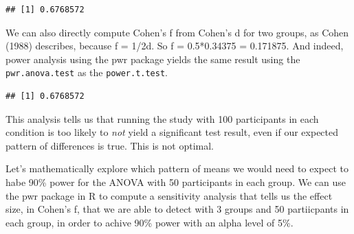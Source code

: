 \documentclass[]{book}
\newenvironment{Shaded}{\begin{snugshade}}{\end{snugshade}}
\newcommand{\CommentTok}[1]{\textcolor[rgb]{0.56,0.35,0.01}{\textit{#1}}}
\newcommand{\DataTypeTok}[1]{\textcolor[rgb]{0.13,0.29,0.53}{#1}}
\newcommand{\DecValTok}[1]{\textcolor[rgb]{0.00,0.00,0.81}{#1}}
\newcommand{\FloatTok}[1]{\textcolor[rgb]{0.00,0.00,0.81}{#1}}
\newcommand{\KeywordTok}[1]{\textcolor[rgb]{0.13,0.29,0.53}{\textbf{#1}}}
\newcommand{\NormalTok}[1]{#1}
\newcommand{\OperatorTok}[1]{\textcolor[rgb]{0.81,0.36,0.00}{\textbf{#1}}}
\newcommand{\StringTok}[1]{\textcolor[rgb]{0.31,0.60,0.02}{#1}}
\begin{document}
\begin{verbatim}
## [1] 0.6768572
\end{verbatim}

We can also directly compute Cohen's f from Cohen's d for two groups, as Cohen (1988) describes, because f = 1/2d. So f = 0.5*0.34375 = 0.171875. And indeed, power analysis using the pwr package yields the same result using the \texttt{pwr.anova.test} as the \texttt{power.t.test}.

\begin{Shaded}
\end{Shaded}

\begin{verbatim}
## [1] 0.6768572
\end{verbatim}

This analysis tells us that running the study with 100 participants in each condition is too likely to \emph{not} yield a significant test result, even if our expected pattern of differences is true. This is not optimal.

Let's mathematically explore which pattern of means we would need to expect to habe 90\% power for the ANOVA with 50 participants in each group. We can use the pwr package in R to compute a sensitivity analysis that tells us the effect size, in Cohen's f, that we are able to detect with 3 groups and 50 partiicpants in each group, in order to achive 90\% power with an alpha level of 5\%.

\begin{Shaded}
\end{Shaded}
\end{document}
